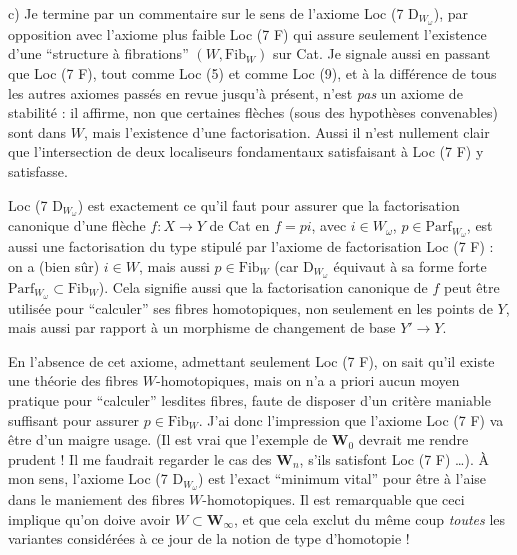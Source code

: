 c) Je termine par un commentaire sur le sens de l'axiome Loc (7 D$_{W_\omega}$), par opposition avec l'axiome plus faible Loc (7 F) qui assure seulement l'existence d'une “structure à fibrations” $(W, \mathrm{Fib}_W)$ sur Cat. Je signale aussi en passant que Loc (7 F), tout comme Loc (5) et comme Loc (9), et à la différence de tous les autres axiomes passés en revue jusqu'à présent, n'est \textit{pas} un axiome de stabilité : il affirme, non que certaines flèches (sous des hypothèses convenables) sont dans $W$, mais l'existence d'une factorisation. Aussi il n'est
nullement clair que l'intersection de deux localiseurs fondamentaux satisfaisant à Loc (7 F) y satisfasse.

Loc (7 D$_{W_\omega}$) est exactement ce qu'il faut pour assurer que la factorisation canonique d'une flèche $f : X \longrightarrow Y$ de Cat en $f = pi$, avec $i \in W_\omega$, $p \in \mathrm{Parf}_{W_\omega}$, est aussi une factorisation du type stipulé par l'axiome de factorisation Loc (7 F) : on a (bien sûr) $i \in W$, mais aussi $p \in \mathrm{Fib}_W$ (car D$_{W_\omega}$ équivaut à sa forme forte $\mathrm{Parf}_{W_\omega} \subset \mathrm{Fib}_W$). Cela signifie aussi que la factorisation canonique de $f$ peut être utilisée pour “calculer” ses fibres homotopiques, non seulement en les points de $Y$, mais aussi par rapport à un morphisme de changement de base $Y' \longrightarrow Y$.

En l'absence de cet axiome,
admettant seulement Loc (7 F), on sait qu'il existe une théorie des fibres $W$-homotopiques, mais on n'a a priori aucun moyen pratique pour “calculer” lesdites fibres, faute de disposer d'un critère maniable suffisant pour assurer $p \in \mathrm{Fib}_W$. J'ai donc l'impression que l'axiome Loc (7 F) va être d'un maigre usage. (Il est vrai que l'exemple de $\mathbf{W}_0$ devrait me rendre prudent ! Il me faudrait regarder le cas des $\mathbf{W}_n$, s'ils satisfont Loc (7 F) \ldots). À mon sens, l'axiome Loc (7 D$_{W_\omega}$) est l'exact “minimum vital” pour être à l'aise dans le maniement des fibres $W$-homotopiques. Il est remarquable que ceci implique qu'on doive avoir $W \subset \mathbf{W}_\infty$, et que cela exclut du même coup \textit{toutes} les variantes considérées à ce jour de la notion de type d'homotopie !

